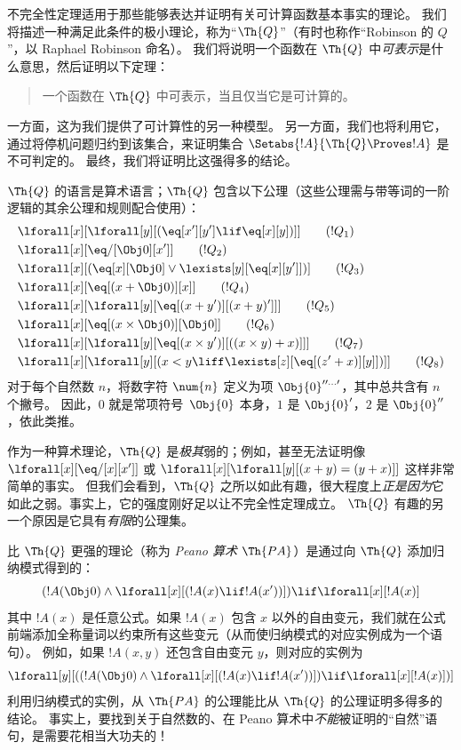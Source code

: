 \documentclass[../../../include/open-logic-section]{subfiles}
\begin{document}

不完全性定理适用于那些能够表达并证明有关可计算函数基本事实的理论。
我们将描述一种满足此条件的极小理论，称为“$\Th{Q}$”（有时也称作“Robinson 的 $Q$”，以 Raphael Robinson 命名）。
我们将说明一个函数在 $\Th{Q}$ 中\emph{可表示}是什么意思，然后证明以下定理：

\begin{quote}
  一个函数在 $\Th{Q}$ 中可表示，当且仅当它是可计算的。
\end{quote}

一方面，这为我们提供了可计算性的另一种模型。
另一方面，我们也将利用它，通过将停机问题归约到该集合，来证明集合 $\Setabs{!A}{\Th{Q} \Proves !A}$ 是不可判定的。
最终，我们将证明比这强得多的结论。

$\Th{Q}$ 的语言是算术语言；$\Th{Q}$ 包含以下公理（这些公理需与带等词的一阶逻辑的其余公理和规则配合使用）：
\begin{align*}
& \lforall[x][\lforall[y][(\eq[x'][y'] \lif \eq[x][y])]] \tag{$!Q_1$}\\
& \lforall[x][\eq/[\Obj 0][x']] \tag{$!Q_2$}\\
& \lforall[x][(\eq[x][\Obj 0] \lor \lexists[y][\eq[x][y']])] \tag{$!Q_3$}\\
& \lforall[x][\eq[(x + \Obj 0)][x]] \tag{$!Q_4$}\\
& \lforall[x][\lforall[y][\eq[(x + y')][(x + y)']]] \tag{$!Q_5$}\\
& \lforall[x][\eq[(x \times \Obj 0)][\Obj 0]] \tag{$!Q_6$}\\
& \lforall[x][\lforall[y][\eq[(x \times y')][((x \times y) + x)]]] \tag{$!Q_7$}\\
& \lforall[x][\lforall[y][(x < y \liff \lexists[z][\eq[(z' + x)][y]])]] \tag{$!Q_8$}
\end{align*}
对于每个自然数 $n$，将数字符 $\num{n}$ 定义为项 $\Obj{0}^{\prime\prime\ldots\prime}$，其中总共含有 $n$ 个撇号。
因此，$\num{0}$ 就是常项符号~$\Obj{0}$ 本身，$\num{1}$ 是 $\Obj{0}'$，$\num{2}$ 是 $\Obj{0}''$，依此类推。

作为一种算术理论，$\Th{Q}$ 是\emph{极其}弱的；例如，甚至无法证明像 $\lforall[x][\eq/[x][x']]$ 或 $\lforall[x][\lforall[y][(x + y) = (y +
    x)]]$ 这样非常简单的事实。
但我们会看到，$\Th{Q}$ 之所以如此有趣，很大程度上\emph{正是因为}它如此之弱。事实上，它的强度刚好足以让不完全性定理成立。
$\Th{Q}$ 有趣的另一个原因是它具有\emph{有限}的公理集。

比 $\Th{Q}$ 更强的理论（称为 \emph{Peano 算术} $\Th{PA}$）是通过向 $\Th{Q}$ 添加归纳模式得到的：
\[
(!A(\Obj 0) \land \lforall[x][(!A(x) \lif !A(x'))]) \lif \lforall[x][!A(x)]
\]
其中 $!A(x)$ 是任意公式。如果 $!A(x)$ 包含 $x$ 以外的自由变元，我们就在公式前端添加全称量词以约束所有这些变元（从而使归纳模式的对应实例成为一个语句）。
例如，如果 $!A(x, y)$ 还包含自由变元 $y$，则对应的实例为
\[
\lforall[y][((!A(\Obj 0) \land \lforall[x][(!A(x) \lif !A(x'))]) \lif
  \lforall[x][!A(x)])]
\]
利用归纳模式的实例，从 $\Th{PA}$ 的公理能比从 $\Th{Q}$ 的公理证明多得多的结论。
事实上，要找到关于自然数的、在 Peano 算术中\emph{不能}被证明的“自然”语句，是需要花相当大功夫的！
\end{document}
